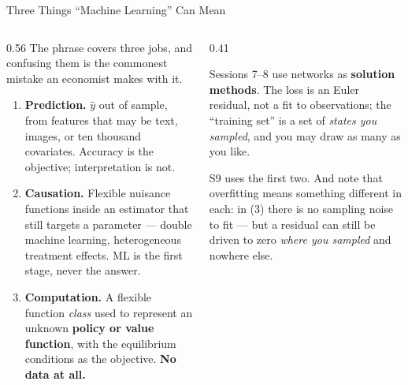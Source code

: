 \begin{frame}{Three Things ``Machine Learning'' Can Mean}
\begin{columns}[T]
\begin{column}{0.56\textwidth}
\small
The phrase covers three jobs, and confusing them is the commonest mistake an economist makes with it.
\medskip

\begin{enumerate}\small\setlength{\itemsep}{1.5mm}
  \item \textbf{Prediction.} $\hat y$ out of sample, from features that may be text, images, or ten thousand covariates. Accuracy is the objective; interpretation is not.
  \item \textbf{Causation.} Flexible nuisance functions inside an estimator that still targets a parameter --- double machine learning, heterogeneous treatment effects. ML is the first stage, never the answer.
  \item \textbf{Computation.} A flexible function \emph{class} used to represent an unknown \textbf{policy or value function}, with the equilibrium conditions as the objective. \textbf{No data at all.}
\end{enumerate}
\end{column}
\begin{column}{0.41\textwidth}
\begin{takeawaybox}[title=\textbf{This course means the third}]\small
Sessions 7--8 use networks as \textbf{solution methods}. The loss is an Euler residual, not a fit to observations; the ``training set'' is a set of \emph{states you sampled}, and you may draw as many as you like.
\end{takeawaybox}
\medskip
\begin{cautionbox}\footnotesize
S9 uses the first two. And note that overfitting means something different in each: in (3) there is no sampling noise to fit --- but a residual can still be driven to zero \emph{where you sampled} and nowhere else.
\end{cautionbox}
\end{column}
\end{columns}
\end{frame}

